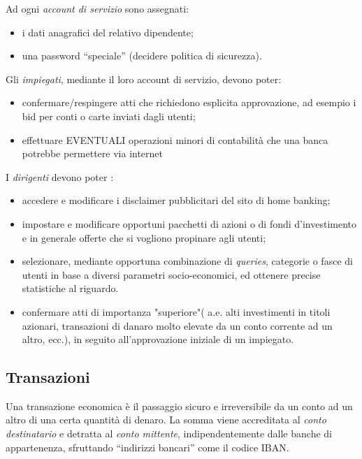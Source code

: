 Ad ogni \emph{account di servizio} sono assegnati:
\begin{itemize}
	\item i dati anagrafici del relativo dipendente;
	\item una password ``speciale'' (decidere politica di sicurezza).
\end{itemize}	

Gli \emph{impiegati}, mediante il loro account di servizio, devono poter: 
\begin{itemize}
	\item confermare/respingere atti che richiedono esplicita approvazione, ad esempio i bid per conti o carte inviati dagli utenti; 
	\item effettuare EVENTUALI operazioni minori di contabilità che una banca potrebbe permettere via internet
\end{itemize}

I \emph{dirigenti} devono poter :
\begin{itemize}
	\item accedere e modificare i disclaimer pubblicitari del sito di home banking;
	\item impostare e modificare opportuni pacchetti di azioni o di fondi d'investimento e in generale offerte che si vogliono propinare agli utenti;
	\item selezionare, mediante opportuna combinazione di \emph{queries}, categorie o fasce di utenti in base a diversi parametri socio-economici, ed ottenere precise statistiche al riguardo.
	\item confermare atti di importanza "superiore"( a.e. alti investimenti in titoli azionari, transazioni di danaro molto elevate da un conto corrente ad un altro, ecc.), in seguito all'approvazione iniziale di un impiegato.
\end{itemize}

\subsection{Transazioni}

Una transazione economica è il passaggio sicuro e irreversibile da un conto ad un altro di una certa quantità di denaro.
La somma viene accreditata al \emph{conto destinatario} e detratta al \emph{conto mittente}, indipendentemente dalle banche di appartenenza, sfruttando ``indirizzi bancari'' come il codice IBAN.



